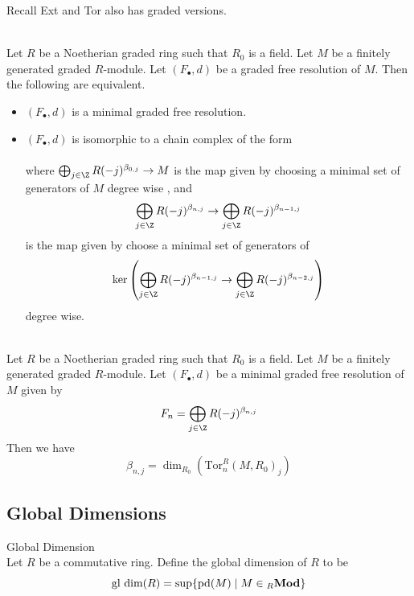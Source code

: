 \documentclass[a4paper]{article}
\begin{document}
Recall Ext and Tor also has graded versions. 

\begin{prp}{}{}\\
Let $R$ be a Noetherian graded ring such that $R_0$ is a field. Let $M$ be a finitely generated graded $R$-module. Let $(F_\bullet,d)$ be a graded free resolution of $M$. Then the following are equivalent. 
\begin{itemize}
\item $(F_\bullet,d)$ is a minimal graded free resolution. 
\item $(F_\bullet,d)$ is isomorphic to a chain complex of the form \\
\\
where $\bigoplus_{j\in\Z}R(-j)^{\beta_{0,j}}\to M$ is the map given by choosing a minimal set of generators of $M$ degree wise , and $$\bigoplus_{j\in\Z}R(-j)^{\beta_{n,j}}\to\bigoplus_{j\in\Z}R(-j)^{\beta_{n-1,j}}$$ is the map given by choose a minimal set of generators of $$\ker\left(\bigoplus_{j\in\Z}R(-j)^{\beta_{n-1,j}}\to\bigoplus_{j\in\Z}R(-j)^{\beta_{n-2,j}}\right)$$ degree wise. 
\end{itemize}
\end{prp}

\begin{crl}{}{}\\
Let $R$ be a Noetherian graded ring such that $R_0$ is a field. Let $M$ be a finitely generated graded $R$-module. Let $(F_\bullet,d)$ be a minimal graded free resolution of $M$ given by $$F_n=\bigoplus_{j\in\Z}R(-j)^{\beta_{n,j}}$$ Then we have $$\beta_{n,j}=\dim_{R_0}(\text{Tor}_n^R(M,R_0)_j)$$
\end{crl}

\subsection{Global Dimensions}
\begin{defn}{Global Dimension}{}\\
Let $R$ be a commutative ring. Define the global dimension of $R$ to be $$\text{gl dim}(R)=\sup\{\text{pd}(M)\;|\;M\in{_R\bold{Mod}}\}$$
\end{defn}
\end{document}
